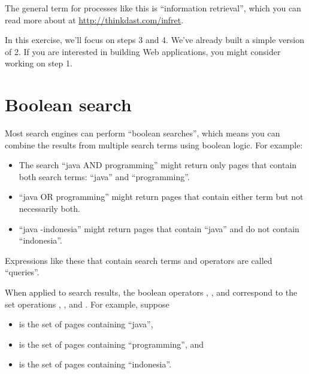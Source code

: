 \documentclass[12pt]{book}
\theoremstyle{exercise}
\begin{document}
The general term for processes like this is ``information retrieval'',
which you can read more about at 
\url{http://thinkdast.com/infret}.

In this exercise, we'll focus on steps 3 and 4. We've already built a simple
version of 2. If you are interested in building Web applications, you
might consider working on step 1.


\section{Boolean search}
\label{boolean-search}


Most search engines can perform ``boolean searches'', which means you
can combine the results from multiple search terms using boolean logic.
For example:

\begin{itemize}

\item
  The search ``java AND programming'' might return only pages that
  contain both search terms: ``java'' and ``programming''.

\item
  ``java OR programming'' might return pages that contain either term
  but not necessarily both.

\item
  ``java -indonesia'' might return pages that contain ``java'' and do
  not contain ``indonesia''.

\end{itemize}

Expressions like these that contain search terms and operators are
called ``queries''.


When applied to search results, the boolean operators ,
, and \java{-} correspond to the set operations
, , and . For
example, suppose

\begin{itemize}

\item
   is the set of pages containing ``java'',

\item
   is the set of pages containing ``programming'', and

\item
   is the set of pages containing ``indonesia''.

\end{itemize}
\end{document}
